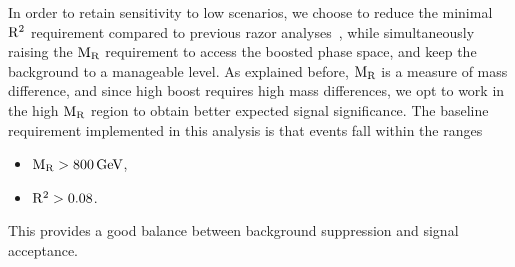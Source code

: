 In order to retain sensitivity to low \ETm scenarios, we choose to reduce the minimal $\mathrm{R^2}$
requirement compared to previous razor
analyses~\cite{Chatrchyan:2011ek,razorPRL,Chatrchyan:2014goa}, while simultaneously raising
the $\mathrm{M_R}$ requirement to access the boosted phase space, and keep the background to a
manageable level.
As explained before, $\mathrm{M_R}$ is a measure of mass difference, and since high boost requires high mass
differences, we opt to work in the high $\mathrm{M_R}$ region to obtain better expected signal
significance. 
The baseline requirement implemented in this analysis is that events fall within the ranges 
\begin{itemize}
\item $\mathrm{M_R} > 800\,\text{Ge\hspace{-.08em}V}$, 
\item $\mathrm{R^2} > 0.08$.
\end{itemize}
This provides a good balance between background suppression and signal acceptance. 
